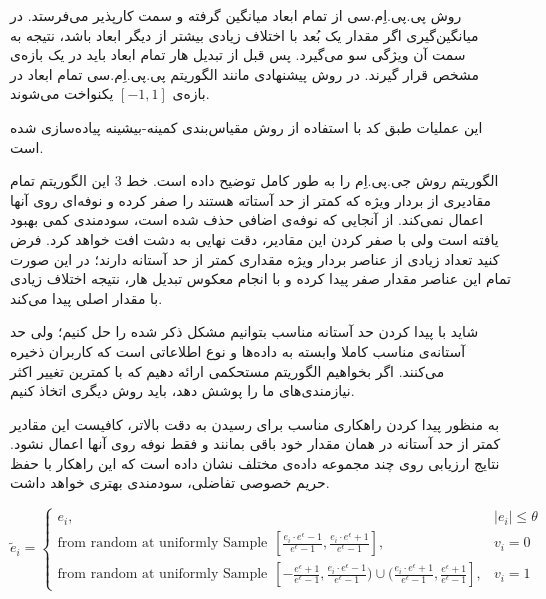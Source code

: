
روش پی.پی.اِم.سی از تمام ابعاد میانگین گرفته و سمت کارپذیر می‌فرستد. در میانگین‌گیری اگر مقدار یک بُعد با اختلاف زیادی بیشتر از دیگر ابعاد باشد، نتیجه به سمت آن ویژگی سو می‌گیرد. پس قبل از تبدیل هار تمام ابعاد باید در یک بازه‌ی مشخص قرار گیرند. در روش پیشنهادی مانند الگوریتم پی.پی.اِم.سی تمام ابعاد در بازه‌ی $[-1, 1]$ یکنواخت می‌شوند.

این عملیات طبق کد  با استفاده از روش مقیاس‌بندی کمینه-بیشینه پیاده‌سازی شده است.



الگوریتم  روش جی.پی.اِم را به طور کامل توضیح داده است. خط 3 این الگوریتم تمام مقادیری از بردار ویژه که کمتر از حد آستاته هستند را صفر کرده و نوفه‌ای روی آنها اعمال نمی‌کند. از آنجایی که نوفه‌ی اضافی حذف شده است، سودمندی کمی بهبود یافته است ولی با صفر کردن این مقادیر، دقت نهایی به دشت افت خواهد کرد. فرض کنید تعداد زیادی از عناصر بردار ویژه مقداری کمتر از حد آستانه دارند؛ در این صورت تمام این عناصر مقدار صفر پیدا کرده و با انجام معکوس تبدیل هار، نتیجه اختلاف زیادی با مقدار اصلی پیدا می‌کند.

شاید با پیدا کردن حد آستانه مناسب بتوانیم مشکل ذکر شده را حل کنیم؛ ولی حد آستانه‌ی مناسب کاملا وابسته به داده‌ها و نوع اطلاعاتی است که کاربران ذخیره می‌کنند. اگر بخواهیم الگوریتم مستحکمی ارائه دهیم که با کمترین تغییر اکثر نیازمندی‌های ما را پوشش دهد، باید روش دیگری اتخاذ کنیم.

به منظور پیدا کردن راهکاری مناسب برای رسیدن به دقت بالاتر، کافیست این مقادیر کمتر از حد آستانه در همان مقدار خود باقی بمانند و فقط نوفه روی آنها اعمال نشود. نتایج ارزیابی روی چند مجموعه داده‌ی مختلف نشان داده است که این راهکار با حفظ حریم خصوصی تفاضلی، سودمندی بهتری خواهد داشت.

$$\tilde{e}_i = 
\begin{cases} 
e_i, & |e_i| \leq \theta \\
\text{from random at uniformly Sample} \hspace{5pt} [\frac{e_i \cdot e^{\epsilon}-1}{e^{\epsilon}-1}, \frac{e_i \cdot e^{\epsilon}+1}{e^{\epsilon}-1}], & v_i = 0 \\
\text{from random at uniformly Sample} \hspace{5pt} [-\frac{e^{\epsilon}+1}{e^{\epsilon}-1}, \frac{e_i \cdot e^{\epsilon}-1}{e^{\epsilon}-1}) \cup (\frac{e_i \cdot e^{\epsilon}+1}{e^{\epsilon}-1}, \frac{e^{\epsilon}+1}{e^{\epsilon}-1}], & v_i = 1 
\end{cases}$$


